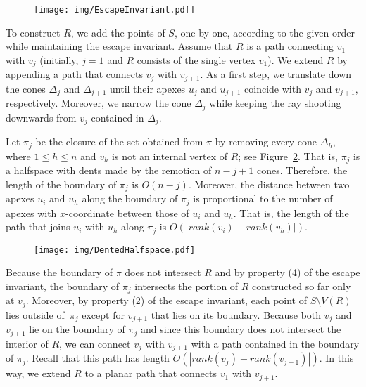 \documentclass[a4paper, 11pt]{article}
\begin{document}
\begin{figure}[tb]
\centering 
\texttt{[image: img/EscapeInvariant.pdf]}
\caption{\small }
\label{fig:Escape Invariant}
\end{figure}

To construct $R$, we add the points of $S$, one by one, according to the given order while maintaining the escape invariant.
Assume that $R$ is a path connecting $v_1$ with $v_j$ (initially, $j=1$ and $R$ consists of the single vertex $v_1$).
We extend $R$ by appending a path that connects $v_j$ with $v_{j+1}$. 
As a first step, we translate down the cones $\Delta_j$ and $\Delta_{j+1}$ until their apexes $u_j$ and $u_{j+1}$ coincide with $v_j$ and $v_{j+1}$, respectively. Moreover, we narrow the cone $\Delta_j$ while keeping the ray shooting downwards from $v_j$ contained in $\Delta_j$.

Let $\pi_j$ be the closure of the set obtained from $\pi$ by removing every cone $\Delta_h$, where $1\leq h\leq n$ and $v_h$ is not an internal vertex of $R$; see Figure~\ref{fig:Dented Halfspace}. That is, $\pi_j$ is a halfspace with dents made by the remotion of $n-j+1$ cones.
Therefore, the length of the boundary of $\pi_j$ is $O(n-j)$. 
Moreover, the distance between two apexes $u_i$ and $u_h$ along the boundary of $\pi_j$ is proportional to the number of apexes with $x$-coordinate between those of $u_i$ and $u_h$. That is, the length of the path that joins $u_i$ with $u_h$ along $\pi_j$ is $O(|rank(v_i) - rank(v_h)|)$. 

\begin{figure}[tb]
\centering
\texttt{[image: img/DentedHalfspace.pdf]}
\caption{\small }
\label{fig:Dented Halfspace}
\end{figure}


Because the boundary of $\pi$ does not intersect $R$ and by property (4) of the escape invariant, the boundary of $\pi_j$ intersects the portion of $R$ constructed so far only at $v_j$. Moreover, by property (2) of the escape invariant, each point of $S\setminus V(R)$ lies outside of~$\pi_j$ except for $v_{j+1}$ that lies on its boundary.
Because both $v_j$ and $v_{j+1}$ lie on the boundary of $\pi_j$ and since this boundary does not intersect the interior of $R$, we can connect $v_j$ with $v_{j+1}$ with a path contained in the boundary of $\pi_j$. 
Recall that this path has length $O(|rank(v_j) - rank(v_{j+1})|)$. In this way, we extend $R$ to a planar path that connects $v_1$ with $v_{j+1}$.
\end{document}

